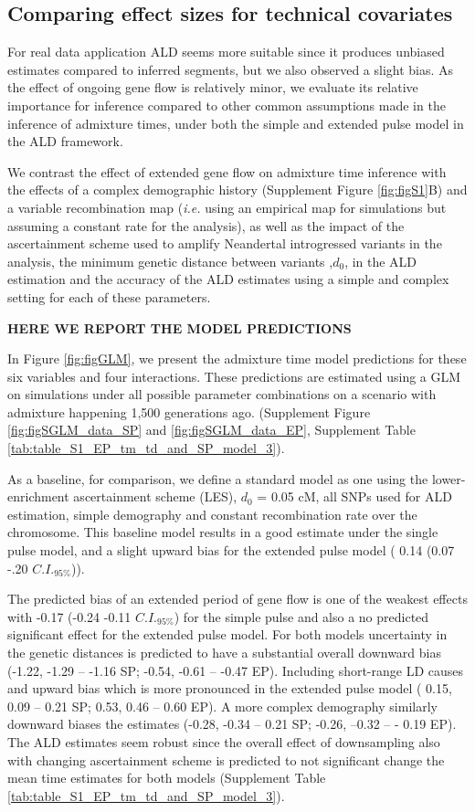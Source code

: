 \documentclass[11pt]{article}
\begin{document}
\subsection{Comparing effect sizes for technical covariates}\label{comparing effect sizes}


For real data application ALD seems more suitable since it produces unbiased estimates compared to inferred segments, but we also observed a slight bias. As the effect of ongoing gene flow is relatively minor, we evaluate its relative importance for inference compared to other common assumptions made in the inference of admixture times, under both the simple and extended pulse model in the ALD framework.

We contrast the effect of extended gene flow on admixture time inference with  the effects of a complex demographic history (Supplement Figure \ref{fig:figS1}B) and a variable recombination map (\emph{i.e.} using an empirical map for simulations but assuming a constant rate for the analysis), as well as the impact of the ascertainment scheme used to amplify Neandertal introgressed variants in the analysis, the minimum genetic distance between variants ,$d_0$, in the ALD estimation and the accuracy of the ALD estimates using a simple and complex setting for each of these parameters. 

\textbf{HERE WE REPORT THE MODEL PREDICTIONS}

In Figure \ref{fig:figGLM}, we present the admixture time model predictions for these six variables and four interactions. These predictions are estimated using a GLM on simulations under all possible parameter combinations on a scenario with admixture happening 1,500 generations ago. (Supplement Figure \ref{fig:figSGLM_data_SP} and \ref{fig:figSGLM_data_EP}, Supplement Table \ref{tab:table_S1_EP_tm_td_and_SP_model_3}).

As a baseline, for comparison, we define a standard model as one using the lower-enrichment ascertainment scheme (LES), $d_{0}$ = 0.05 cM, all SNPs used for ALD estimation, simple demography and constant recombination rate over the chromosome. This baseline model results in a good estimate under the single pulse model, and a slight upward bias for the extended pulse model ( 0.14 (0.07 -.20 $C.I._{95\%}$)). 

The predicted bias of an extended period of gene flow is one of the weakest effects with -0.17 (-0.24 -0.11 $C.I._{95\%}$) for the simple pulse and also a no predicted significant effect for the extended pulse model. For both models uncertainty in the genetic distances is predicted to have a substantial overall downward bias (-1.22, -1.29 -- -1.16 SP; -0.54, -0.61 -- -0.47 EP). Including short-range LD causes and upward bias which is more pronounced in the extended pulse model ( 0.15, 0.09 -- 0.21 SP; 0.53, 0.46 -- 0.60 EP). A more complex demography similarly downward biases the estimates (-0.28, -0.34 -- 0.21 SP; -0.26, --0.32 -- - 0.19 EP). The ALD estimates seem robust since the overall effect of downsampling also with changing ascertainment scheme is predicted to not significant change the mean time estimates for both models (Supplement Table \ref{tab:table_S1_EP_tm_td_and_SP_model_3}).
\end{document}
